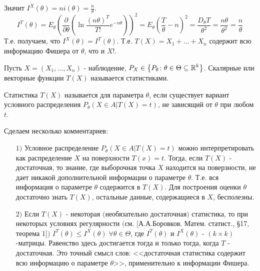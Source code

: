 \begin{example}
	Значит $\displaystyle I^X (\theta) = n i(\theta) = \frac{n}{\theta}$.
	$$I^T (\theta) = E_{\theta} \left( \frac{\partial}{\partial \theta} \left( \ln \frac{(n \theta)^T}{T!} e^{-n \theta} \right) \right)^2 = E_{\theta} \left( \frac{T}{\theta} - n \right)^2 = \frac{D_{\theta} T}{\theta^2} = \frac{n \theta}{\theta^2} = \frac{n}{\theta}$$
	Т.е. получаем, что $\displaystyle I^X (\theta) = I^T (\theta)$. Т.е. $T(X) = X_1 + \dots + X_n$ содержит всю информацию Фишера от $\theta$, что и $X!$.
\end{example}

Пусть $X = (X_1, \dots, X_n)$ - наблюдение, $\displaystyle P_X \in \left\{P_{\theta}\colon\theta \in \Theta \subseteq \mathbb{R}^k\right\}$. Скалярные или векторные функции $T(X)$ называется статистиками.

\begin{definition}\label{cha:7/def:1}
	Статистика $T(X)$ называется  для параметра $\theta$, если существует вариант условного распределения $P_{\theta}\left( X \in A | T(X) = t \right)$, не зависящий от $\theta$ при любом $t$.
\end{definition}

\begin{remark}\label{cha:7/remark:1}
	Сделаем несколько комментариев:
	\begin{itemize}
		\item[$1)$]
			Условное распределение $P_{\theta}\left( X \in A | T(X) = t \right)$ можно интерпретировать как распределение $X$ на поверхности $T(x) = t$. Тогда, если $T(X)$ - достаточная, то знание, где выборочная точка $X$ находится на поверзности, не дает никакой дополнительной информации о параметре $\theta$. Т.е. вся информация о параметре $\theta$ содержится в $T(X)$. Для построения оценки $\theta$ достаточно знать $T(X)$, остальные данные, содержащиеся в $X$, бесполезны.
		\item[$2)$]
			Если $T(X)$ - некоторая $($необязательно достаточная$)$ статистика, то при некоторых условиях регулярности $($см. [А.А.Боровков. Матем. статист., §17, теорема 1]$)$ $\displaystyle I^T (\theta) \le I^X (\theta) \; \forall \theta \in \Theta$, где $I^T (\theta)$ и $I^X (\theta)$ - $(k \times k)$-матрицы. Равенство здесь достигается тогда и только тогда, когда $T$ - достаточная. Это точный смысл слов: <<достаточная статистика содержит всю информацию о параметре $\theta$>>, применительно к информации Фишера.
	\end{itemize}
\end{remark}

